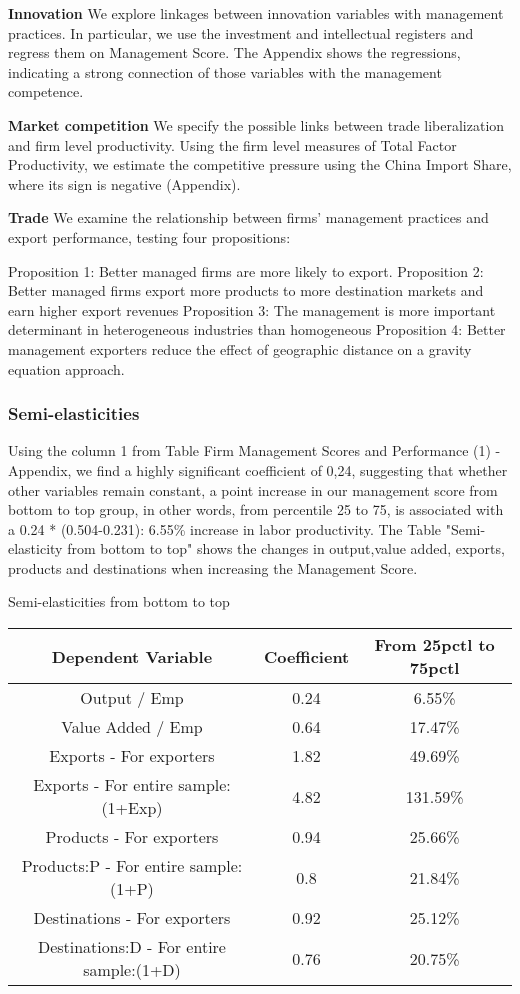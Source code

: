 \documentclass{article}
\begin{document}
\textbf{Innovation}
We explore linkages between innovation variables with management practices. In particular, we use the investment and intellectual registers and regress them on Management Score. The Appendix shows the regressions, indicating a strong connection of those variables with the management competence.

\textbf{Market competition}
We specify the possible links between trade liberalization and firm level productivity. Using the firm level measures of Total Factor Productivity, we estimate  the competitive pressure using the China Import Share, where its sign is negative (Appendix).

\textbf{Trade}
We examine the relationship between firms’ management practices and export performance, testing four propositions:

Proposition 1: Better managed firms are more likely to export.
Proposition 2: Better managed firms export more products to more destination markets and earn
higher export revenues
Proposition 3: The management is more important determinant in heterogeneous industries than homogeneous
Proposition 4: Better management exporters reduce the effect of geographic distance on a gravity equation approach.

\subsubsection{Semi-elasticities}
Using the column 1 from Table Firm Management Scores and Performance (1) - Appendix, we find a highly significant coefficient of 0,24, suggesting that whether other variables remain constant, a point increase in our management score from bottom to top group, in other words, from percentile 25 to 75, is associated with a 0.24 * (0.504-0.231): 6.55\% increase in labor productivity. 
The Table "Semi-elasticity from bottom to top" shows the changes in output,value added, exports, products and destinations when increasing the Management Score.

\begin{center}
 \caption{Semi-elasticities from bottom to top}
 \label{}
 \begin{tabular}{||c c c||} 
 \hline
Dependent Variable & Coefficient & From 25pctl to 75pctl \\ [0.5ex] 
 \hline\hline
Output / Emp & 0.24 & 6.55\% \\ 
 \hline
Value Added / Emp & 0.64 & 17.47\%\\
 \hline
Exports - For exporters & 1.82 & 49.69\% \\
 \hline
Exports - For entire sample:(1+Exp) & 4.82 & 131.59\% \\
  \hline
Products - For exporters & 0.94 & 25.66\% \\
  \hline
Products:P - For entire sample:(1+P) & 0.8 & 21.84\% \\
  \hline
Destinations - For exporters & 0.92 & 25.12\% \\
 \hline
Destinations:D - For entire sample:(1+D) & 0.76 & 20.75\% \\ [1ex] 
 \hline

\end{tabular}
\end{center}
\end{document}
